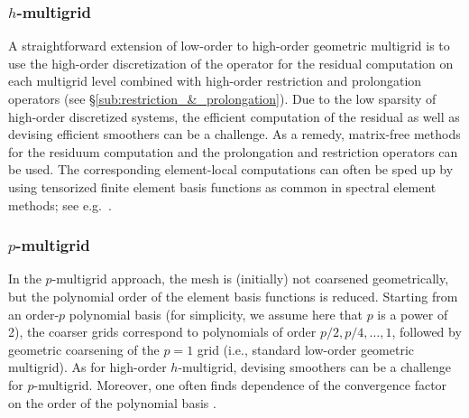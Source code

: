 \documentclass[smallcondensed,final]{svjour3}     %
\begin{document}
\subsubsection{$h$-multigrid}\label{subsec:h}
A straightforward extension of low-order to high-order geometric
multigrid is to use the high-order discretization of the operator for
the residual computation on each multigrid level combined with
high-order restriction and prolongation operators
(see \S\ref{sub:restriction_&_prolongation}).
Due to the low sparsity of high-order discretized systems, the
efficient computation of the residual as well as devising efficient
smoothers can be a challenge. As a remedy, matrix-free methods for the
residuum computation and the prolongation and restriction operators
can be used. The corresponding element-local computations can often be
sped up by using tensorized finite element basis functions as common
in spectral element methods; see e.g.~\cite{DevilleFischerMund02}.

\subsubsection{$p$-multigrid}\label{subsec:p}
In the $p$-multigrid approach, the mesh is (initially) not coarsened
geometrically, but the polynomial order of the element basis functions
is reduced. Starting from an order-$p$ polynomial basis (for
simplicity, we assume here that $p$ is a power of 2), the coarser
grids correspond to polynomials of order $p/2, p/4,\ldots,1$, followed
by geometric coarsening of the $p=1$ grid (i.e., standard low-order
geometric multigrid).  As for high-order $h$-multigrid, devising
smoothers can be a challenge for $p$-multigrid.  Moreover, one often
finds dependence of the convergence factor on the order of the
polynomial basis \cite{MadayMunoz89}.
\end{document}

